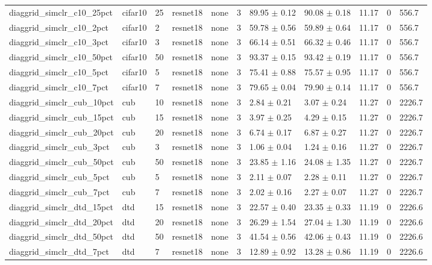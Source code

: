 \begin{tabular}{lllllllllll}
diaggrid_simclr_c10_25pct & cifar10 & 25 & resnet18 & none & 3 & 89.95 $\pm$ 0.12 & 90.08 $\pm$ 0.18 & 11.17 & 0 & 556.7 \\
diaggrid_simclr_c10_2pct & cifar10 & 2 & resnet18 & none & 3 & 59.78 $\pm$ 0.56 & 59.89 $\pm$ 0.64 & 11.17 & 0 & 556.7 \\
diaggrid_simclr_c10_3pct & cifar10 & 3 & resnet18 & none & 3 & 66.14 $\pm$ 0.51 & 66.32 $\pm$ 0.46 & 11.17 & 0 & 556.7 \\
diaggrid_simclr_c10_50pct & cifar10 & 50 & resnet18 & none & 3 & 93.37 $\pm$ 0.15 & 93.42 $\pm$ 0.19 & 11.17 & 0 & 556.7 \\
diaggrid_simclr_c10_5pct & cifar10 & 5 & resnet18 & none & 3 & 75.41 $\pm$ 0.88 & 75.57 $\pm$ 0.95 & 11.17 & 0 & 556.7 \\
diaggrid_simclr_c10_7pct & cifar10 & 7 & resnet18 & none & 3 & 79.65 $\pm$ 0.04 & 79.90 $\pm$ 0.14 & 11.17 & 0 & 556.7 \\
diaggrid_simclr_cub_10pct & cub & 10 & resnet18 & none & 3 & 2.84 $\pm$ 0.21 & 3.07 $\pm$ 0.24 & 11.27 & 0 & 2226.7 \\
diaggrid_simclr_cub_15pct & cub & 15 & resnet18 & none & 3 & 3.97 $\pm$ 0.25 & 4.29 $\pm$ 0.15 & 11.27 & 0 & 2226.7 \\
diaggrid_simclr_cub_20pct & cub & 20 & resnet18 & none & 3 & 6.74 $\pm$ 0.17 & 6.87 $\pm$ 0.27 & 11.27 & 0 & 2226.7 \\
diaggrid_simclr_cub_3pct & cub & 3 & resnet18 & none & 3 & 1.06 $\pm$ 0.04 & 1.24 $\pm$ 0.16 & 11.27 & 0 & 2226.7 \\
diaggrid_simclr_cub_50pct & cub & 50 & resnet18 & none & 3 & 23.85 $\pm$ 1.16 & 24.08 $\pm$ 1.35 & 11.27 & 0 & 2226.7 \\
diaggrid_simclr_cub_5pct & cub & 5 & resnet18 & none & 3 & 2.11 $\pm$ 0.07 & 2.28 $\pm$ 0.11 & 11.27 & 0 & 2226.7 \\
diaggrid_simclr_cub_7pct & cub & 7 & resnet18 & none & 3 & 2.02 $\pm$ 0.16 & 2.27 $\pm$ 0.07 & 11.27 & 0 & 2226.7 \\
diaggrid_simclr_dtd_15pct & dtd & 15 & resnet18 & none & 3 & 22.57 $\pm$ 0.40 & 23.35 $\pm$ 0.33 & 11.19 & 0 & 2226.6 \\
diaggrid_simclr_dtd_20pct & dtd & 20 & resnet18 & none & 3 & 26.29 $\pm$ 1.54 & 27.04 $\pm$ 1.30 & 11.19 & 0 & 2226.6 \\
diaggrid_simclr_dtd_50pct & dtd & 50 & resnet18 & none & 3 & 41.54 $\pm$ 0.56 & 42.06 $\pm$ 0.43 & 11.19 & 0 & 2226.6 \\
diaggrid_simclr_dtd_7pct & dtd & 7 & resnet18 & none & 3 & 12.89 $\pm$ 0.92 & 13.28 $\pm$ 0.86 & 11.19 & 0 & 2226.6 \\

\end{tabular}
